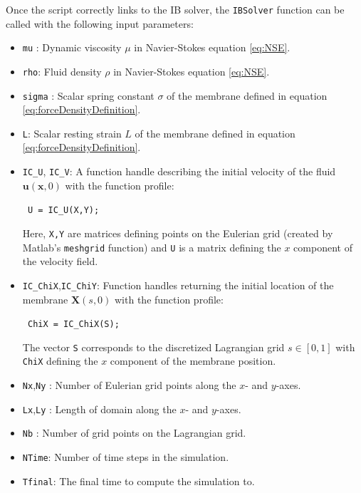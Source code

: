 \documentclass{article}
\newcommand{\mycode}[1]{\texttt{#1}}
\newcommand{\bs}[1]{\boldsymbol{#1}}
\begin{document}
Once the script correctly links to the IB solver, the \mycode{IBSolver} function can be called 
with the following input parameters:
\begin{itemize}
\item \mycode{mu} : Dynamic viscosity $\mu$ in Navier-Stokes equation \eqref{eq:NSE}.
\item \mycode{rho}: Fluid density $\rho$ in Navier-Stokes equation \eqref{eq:NSE}.
\item \mycode{sigma} : Scalar spring constant $\sigma$ of the membrane defined in equation \eqref{eq:forceDensityDefinition}.
\item \mycode{L}: Scalar resting strain $L$ of the membrane defined in equation \eqref{eq:forceDensityDefinition}.

\item \mycode{IC\_U}, \mycode{IC\_V}: A function handle describing the initial velocity of the fluid $\bs{u}(\bs{x},0)$
						with the function profile:
						\begin{center}\mycode{ U = IC\_U(X,Y);}\end{center}
						Here, \mycode{X,\;Y} are matrices defining points on the Eulerian grid (created by Matlab's \mycode{meshgrid} function) and
						\mycode{U} is a matrix defining the $x$ component of the velocity field.
\item \mycode{IC\_ChiX},\;\mycode{IC\_ChiY}: Function handles returning the initial location of the membrane $\bs{X}(s,0)$
							with the function profile:
							\begin{center}\mycode{ ChiX = IC\_ChiX(S);}\end{center}
							The vector \mycode{S} corresponds to the discretized Lagrangian grid $s\in[0,1]$ with
							\mycode{ChiX} defining the $x$ component of the membrane position.
							
\item \mycode{Nx},\;\mycode{Ny} : Number of Eulerian grid points along the $x$- and $y$-axes.
\item \mycode{Lx},\;\mycode{Ly} : Length of domain along the $x$- and $y$-axes.
\item \mycode{Nb} : Number of grid points on the Lagrangian grid.
\item \mycode{NTime}: Number of time steps in the simulation.
\item \mycode{Tfinal}: The final time to compute the simulation to.


\end{itemize}
\end{document}
